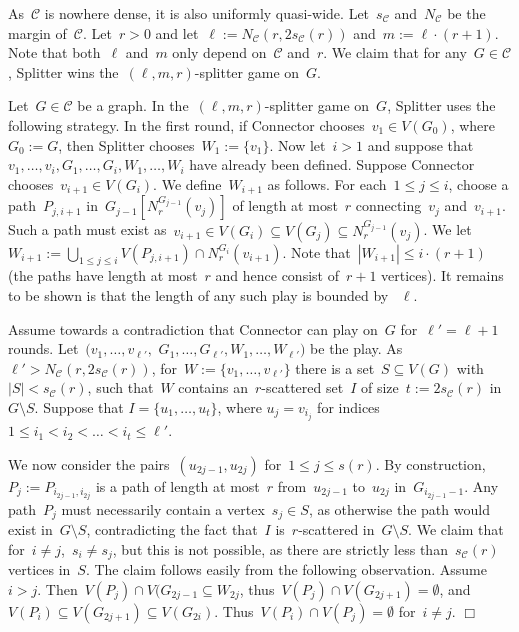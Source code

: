 \documentclass[11pt]{article}
\numberwithin{equation}{section}
\newcommand{\CCC}{\mathcal{C}} \newcommand{\DDD}{\mathcal{D}}
\def\qed{\hspace*{\fill}$\Box$}
\newenvironment{proof}[1][]%
{\ifthenelse{\equal{#1}{}}{\noindent\textit{Proof.
    }}{\noindent\textit{#1. }}}%
{\qed\par\smallskip}
\begin{document}
\begin{proof}
  As~$\CCC$ is nowhere dense, it is also uniformly
  quasi-wide. Let~$s_\CCC$ and~$N_\CCC$ be the margin of~$\CCC$.
  Let~$r> 0$ and let~${\ell}:=N_\CCC(r,2s_\CCC(r))$ and~$m:=
  {\ell}\cdot (r+1)$. Note that both~${\ell}$ and~$m$ only depend
  on~$\CCC$ and~$r$. We claim that for any~$G\in\CCC$, Splitter wins
  the~$({\ell},m,r)$-splitter game on~$G$.

  Let~$G\in\CCC$ be a graph. In the~$({\ell},m,r)$-splitter game
  on~$G$, Splitter uses the following strategy. In the first round, if
  Connector chooses~$v_1\in V(G_0)$, where~$G_0:=G$, then Splitter
  chooses~$W_1:=\{v_1\}$. Now let~$i>1$ and suppose that~$v_1,\ldots,
  v_i, G_1,\ldots, G_i, W_1,\ldots, W_i$ have already been
  defined. Suppose Connector chooses~$v_{i+1}\in V(G_i)$. We
  define~$W_{i+1}$ as follows. For each~$1\leq j\leq i$, choose a
  path~$P_{j,i+1}$ in~$G_{j-1}[N_r^{G_{j-1}}(v_j)]$ of length at
  most~$r$ connecting~$v_j$ and~$v_{i+1}$. Such a path must exist
  as~$v_{i+1}\in V(G_{i})\subseteq V(G_j)\subseteq
  N_r^{G_{j-1}}(v_j)$. We let~$W_{i+1}:=\bigcup_{1\leq j\leq
    i}V(P_{j,i+1})\cap N_r^{G_{i}}(v_{i+1})$. Note that~$|W_{i+1}|\leq
  i\cdot (r+1)$ (the paths have length at most~$r$ and hence consist
  of~$r+1$ vertices). It remains to be shown is that the length of any
  such play is bounded by ~${\ell}$.
  

  Assume towards a contradiction that Connector can play on~$G$
  for~${\ell}'={\ell}+1$ rounds. Let~$(v_1,\ldots,
  v_{{\ell}'},$ $G_1,\ldots, G_{{\ell}'}, W_1,\ldots, W_{{\ell}'})$ be
  the play. As~${\ell}'>N_\CCC(r,2s_\CCC(r))$, for~$W:=\{v_1,\ldots,
  v_{{\ell}'}\}$ there is a set~$S\subseteq V(G)$
  with~$|S|<s_\CCC(r)$, such that~$W$ contains an~$r$-scattered
  set~$I$ of size~$t:=2s_\CCC(r)$ in~$G\setminus S$.   Suppose that $I=\{u_1,\ldots,u_t\}$, where $u_j=v_{i_j}$
    for indices $1\le i_1<i_2<\ldots<i_t\le\ell'$.


  We now consider the pairs~$(u_{2j-1}, u_{2j})$ for~$1\leq j\leq
  s(r)$. By construction,~$P_j:=P_{i_{2j-1}, i_{2j}}$ is a path of
  length at most~$r$ from~$u_{2j-1}$ to~$u_{2j}$
  in~$G_{i_{2j-1}-1}$. Any path~$P_j$ must necessarily contain a
  vertex~$s_j\in S$, as otherwise the path would exist in~$G \setminus
  S$,
  contradicting the fact that~$I$ is~$r$-scattered in~$G \setminus S$. We claim
  that for~$i\neq j$,~$s_i\neq s_j$, but this is not possible, as
  there are strictly less than~$s_\CCC(r)$ vertices in~$S$. The claim
  follows easily from the following
  observation. Assume~$i>j$. Then~$V(P_j)\cap V(G_{2j-1}\subseteq W_{2j}$, thus~$V(P_j)\cap V(G_{2j+1})=\emptyset$,
  and~$V(P_i)\subseteq V(G_{2j+1})\subseteq
  V(G_{2i})$. Thus~$V(P_i)\cap V(P_j)=\emptyset$ for~$i\neq j$.
\end{proof}
\end{document}
